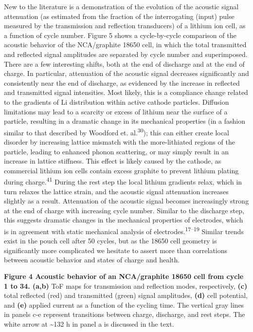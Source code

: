 \documentclass[]{article}
\begin{document}
{ }New to the literature is a demonstration of the evolution of the
acoustic signal attenuation (as estimated from the fraction of the
interrogating (input) pulse measured by the transmission and reflection
transducers) of a lithium ion cell, as a function of cycle number.
Figure 5 shows a cycle-by-cycle comparison of the acoustic behavior of
the NCA/graphite 18650 cell, in which the total transmitted and
reflected signal amplitudes are separated by cycle number and
superimposed. There are a few interesting shifts, both at the end of
discharge and at the end of charge. In particular, attenuation of the
acoustic signal decreases significantly and consistently near the end of
discharge, as evidenced by the increase in reflected and transmitted
signal intensities. Most likely, this is a compliance change related to
the gradients of Li distribution within active cathode particles.
Diffusion limitations may lead to a scarcity or excess of lithium near
the surface of a particle, resulting in a dramatic change in its
mechanical properties (in a fashion similar to that described by
Woodford et. al.\textsuperscript{30}); this can either create local
disorder by increasing lattice mismatch with the more-lithiated regions
of the particle, leading to enhanced phonon scattering, or may simply
result in an increase in lattice stiffness. This effect is likely caused
by the cathode, as commercial lithium ion cells contain excess graphite
to prevent lithium plating during charge.\textsuperscript{41} During the
rest step the local lithium gradients relax, which in turn relaxes the
lattice strain, and the acoustic signal attenuation increases slightly
as a result. Attenuation of the acoustic signal becomes increasingly
strong at the end of charge with increasing cycle number. Similar to the
discharge step, this suggests dramatic changes in the mechanical
properties of electrodes, which is in agreement with static mechanical
analysis of electrodes.\textsuperscript{17--19} Similar trends exist in
the pouch cell after 50 cycles, but as the 18650 cell geometry is
significantly more complicated we hesitate to assert more than
correlations between acoustic behavior and states of charge and health.

\textbf{Figure 4 \textbar{} Acoustic behavior of an NCA/graphite 18650
cell from cycle 1 to 34. (a,b)} ToF maps for transmission and reflection
modes, respectively, \textbf{(c)} total reflected (red) and transmitted
(green) signal amplitudes, \textbf{(d)} cell potential, and \textbf{(e)}
applied current as a function of the cycling time. The vertical gray
lines in panels c-e represent transitions between charge, discharge, and
rest steps. The white arrow at \textasciitilde{}132 h in panel a is
discussed in the text.
\end{document}
